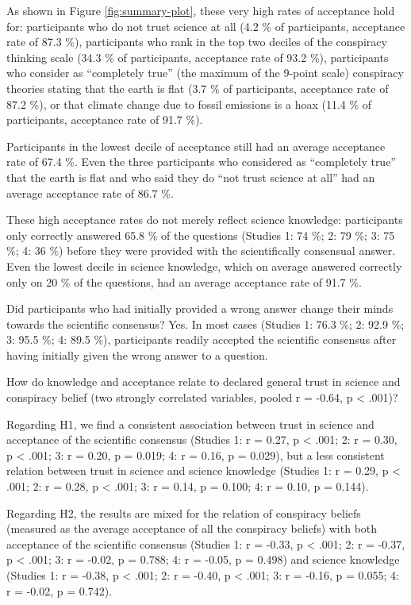 \documentclass[
  doc,floatsintext]{apa6}
\begin{document}
As shown in Figure \ref{fig:summary-plot}, these very high rates of acceptance hold for: participants who do not trust science at all (4.2 \% of participants, acceptance rate of 87.3 \%), participants who rank in the top two deciles of the conspiracy thinking scale (34.3 \% of participants, acceptance rate of 93.2 \%), participants who consider as ``completely true'' (the maximum of the 9-point scale) conspiracy theories stating that the earth is flat (3.7 \% of participants, acceptance rate of 87.2 \%), or that climate change due to fossil emissions is a hoax (11.4 \% of participants, acceptance rate of 91.7 \%).

Participants in the lowest decile of acceptance still had an average acceptance rate of 67.4 \%. Even the three participants who considered as ``completely true'' that the earth is flat and who said they do ``not trust science at all'' had an average acceptance rate of 86.7 \%.

These high acceptance rates do not merely reflect science knowledge: participants only correctly answered 65.8 \% of the questions (Studies 1: 74 \%; 2: 79 \%; 3: 75 \%; 4: 36 \%) before they were provided with the scientifically consensual answer. Even the lowest decile in science knowledge, which on average answered correctly only on 20 \% of the questions, had an average acceptance rate of 91.7 \%.

Did participants who had initially provided a wrong answer change their minds towards the scientific consensus? Yes. In most cases (Studies 1: 76.3 \%; 2: 92.9 \%; 3: 95.5 \%; 4: 89.5 \%), participants readily accepted the scientific consensus after having initially given the wrong answer to a question.

How do knowledge and acceptance relate to declared general trust in science and conspiracy belief (two strongly correlated variables, pooled r = -0.64, p \textless{} .001)?

Regarding H1, we find a consistent association between trust in science and acceptance of the scientific consensus (Studies 1: r = 0.27, p \textless{} .001; 2: r = 0.30, p \textless{} .001; 3: r = 0.20, p = 0.019; 4: r = 0.16, p = 0.029), but a less consistent relation between trust in science and science knowledge (Studies 1: r = 0.29, p \textless{} .001; 2: r = 0.28, p \textless{} .001; 3: r = 0.14, p = 0.100; 4: r = 0.10, p = 0.144).

Regarding H2, the results are mixed for the relation of conspiracy beliefs (measured as the average acceptance of all the conspiracy beliefs) with both acceptance of the scientific consensus (Studies 1: r = -0.33, p \textless{} .001; 2: r = -0.37, p \textless{} .001; 3: r = -0.02, p = 0.788; 4: r = -0.05, p = 0.498) and science knowledge (Studies 1: r = -0.38, p \textless{} .001; 2: r = -0.40, p \textless{} .001; 3: r = -0.16, p = 0.055; 4: r = -0.02, p = 0.742).
\end{document}
